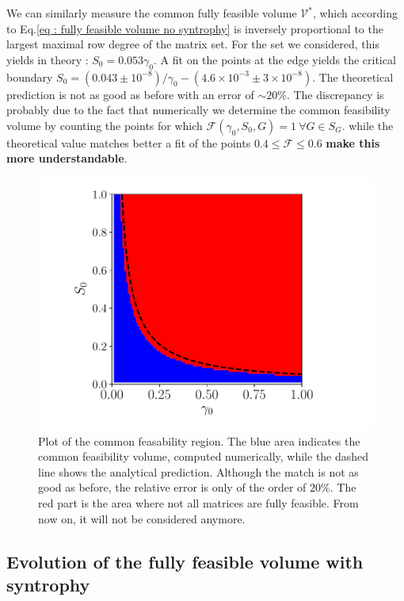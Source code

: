 \documentclass[12pt, titlepage]{report}
\begin{document}
We can similarly measure the common fully feasible volume $\mathcal{V^*}$, which according to Eq.\eqref{eq : fully feasible volume no syntrophy} is inversely proportional to the largest maximal row degree of the matrix set. For the set we considered, this yields in theory : $S_0 = 0.053 \gamma_0$. A fit on the points at the edge yields the critical boundary $S_0 = (0.043 \pm 10^{-8})/\gamma_0 - (4.6 \times 10^{-3} \pm 3 \times 10^{-8})$. The theoretical prediction is not as good as before with an error of $\sim 20 \%$. The discrepancy is probably due to the fact that numerically we determine the common feasibility volume by counting the points for which $\mathcal{F}(\gamma_0, S_0, G)=1 \ \forall G \in S_G$.
while the theoretical value matches better a fit of the points $0.4 \leq \mathcal{F} \leq 0.6$ \textbf{make this more understandable}.
\begin{figure}[h!]
\centering
\includegraphics[width=0.7\linewidth]{Results/common_feasibility_volume}
\caption{Plot of the common feasability region. The blue area indicates the common feasibility volume, computed numerically, while the dashed line shows the analytical prediction. Although the match is not as good as before, the relative error is only of the order of $20 \%$. The red part is the area where not all matrices are fully feasible. From now on, it will not be considered anymore.}
\label{fig : common feasible volume}
\end{figure}

\subsection{Evolution of the fully feasible volume with syntrophy}
\end{document}

